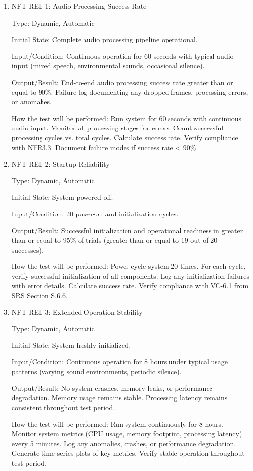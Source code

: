 \documentclass[12pt, titlepage]{article}
\begin{document}
\begin{enumerate}

\item{NFT-REL-1: Audio Processing Success Rate\\}

Type: Dynamic, Automatic

Initial State: Complete audio processing pipeline operational.

Input/Condition: Continuous operation for 60 seconds with typical audio input
(mixed speech, environmental sounds, occasional silence).

Output/Result: End-to-end audio processing success rate greater than or equal to 90\%. Failure log
documenting any dropped frames, processing errors, or anomalies.

How the test will be performed: Run system for 60 seconds with continuous audio
input. Monitor all processing stages for errors. Count successful processing
cycles vs. total cycles. Calculate success rate. Verify compliance with NFR3.3.
Document failure modes if success rate < 90\%.

\item{NFT-REL-2: Startup Reliability\\}

Type: Dynamic, Automatic

Initial State: System powered off.

Input/Condition: 20 power-on and initialization cycles.

Output/Result: Successful initialization and operational readiness in greater than or equal to 95\% of
trials (greater than or equal to 19 out of 20 successes).

How the test will be performed: Power cycle system 20 times. For each cycle, verify
successful initialization of all components. Log any initialization failures
with error details. Calculate success rate. Verify compliance with VC-6.1 from
SRS Section S.6.6.

\item{NFT-REL-3: Extended Operation Stability\\}

Type: Dynamic, Automatic

Initial State: System freshly initialized.

Input/Condition: Continuous operation for 8 hours under typical usage patterns
(varying sound environments, periodic silence).

Output/Result: No system crashes, memory leaks, or performance degradation.
Memory usage remains stable. Processing latency remains consistent throughout
test period.

How the test will be performed: Run system continuously for 8 hours. Monitor system
metrics (CPU usage, memory footprint, processing latency) every 5 minutes. Log
any anomalies, crashes, or performance degradation. Generate time-series plots
of key metrics. Verify stable operation throughout test period.

\end{enumerate}
\end{document}
